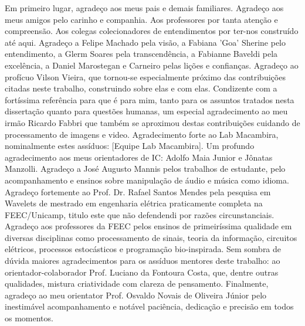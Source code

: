 Em primeiro lugar, agradeço aos meus pais e demais familiares. Agradeço aos
meus amigos pelo carinho e companhia. Aos professores por tanta atenção e compreensão.
Aos colegas colecionadores de entendimentos por ter-nos construído até aqui.
Agradeço a Felipe Machado pela visão, a Fabiana 'Goa' Sherine pelo entendimento,
a Glerm Soares pela transcendência, a Fabianne Baveldi pela excelência, a Daniel
Marostegan e Carneiro pelas lições e confianças. Agradeço ao profícuo Vilson Vieira, que tornou-se especialmente próximo
das contribuições citadas neste trabalho, construindo sobre elas e com elas. Condizente com a fortíssima referência
para que é para mim, tanto para os assuntos tratados nesta dissertação quanto para questões humanas, um especial agradecimento
ao meu irmão Ricardo Fabbri que também se aproximou destas contribuições cuidando de processamento de imagens e video. Agradecimento
forte ao Lab Macambira, nominalmente estes assíduos: [Equipe Lab Macambira]. Um profundo agradecimento
aos meus orientadores de IC: Adolfo Maia Junior e Jônatas Manzolli. Agradeço a José Augusto Mannis
pelos trabalhos de estudante, pelo acompanhamento e ensinos sobre manipulação de áudio e música como idioma.
Agradeço fortemente ao Prof. Dr. Rafael Santos Mendes pela pesquisa em Wavelets de mestrado em engenharia elétrica
praticamente completa na FEEC/Unicamp, titulo este que não defendendi por razões circunstanciais. Agradeço aos professores da FEEC pelos ensinos de
primeiríssima qualidade em diversas disciplinas como processamento de sinais, teoria da informação, 
circuitos elétricos, processos estocásticos
e programação bio-inspirada. Sem sombra de dúvida maiores agradecimentos para os assíduos mentores
deste trabalho: ao orientador-colaborador Prof. Luciano da Fontoura Costa, que, dentre outras qualidades,
mistura criatividade com clareza de pensamento. Finalmente, agradeço ao meu 
orientator Prof. Osvaldo Novais de Oliveira Júnior pelo inestimável acompanhamento
e notável paciência, dedicação e precisão em todos os momentos.